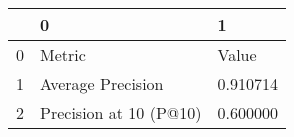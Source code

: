 \begin{tabular}{lll}
\toprule
 & 0 & 1 \\
\midrule
0 & Metric & Value \\
1 & Average Precision & 0.910714 \\
2 & Precision at 10 (P@10) & 0.600000 \\
\bottomrule
\end{tabular}

